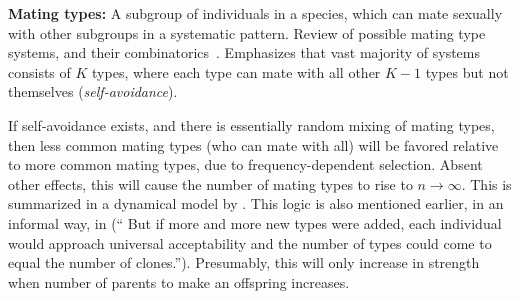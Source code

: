 






\textbf{Mating types:} A subgroup of individuals in a species, which can mate sexually with other subgroups in a systematic pattern.  Review of possible mating type systems, and their combinatorics~\cite{bull_combinatorics_1989}. Emphasizes that vast majority of systems consists of $K$ types, where each type can mate with all other $K-1$ types but not themselves (\emph{self-avoidance}).




If self-avoidance exists, and there is essentially random mixing of mating types, then less common mating types (who can mate with all) will be favored relative to more common mating types,  due to frequency-dependent selection. Absent other effects, this will cause the number of mating types to rise to $n\to \infty$.  This is summarized in a dynamical model by \cite{bull_combinatorics_1989,iwasa_evolution_1987}. This logic is also mentioned earlier, in an informal way, in \cite{power_forces_1976} (`` But if more and more new types were added, each individual would approach universal acceptability and the number of types could come to equal the number of clones.''). Presumably, this will only increase in strength when number of parents to make an offspring increases.

